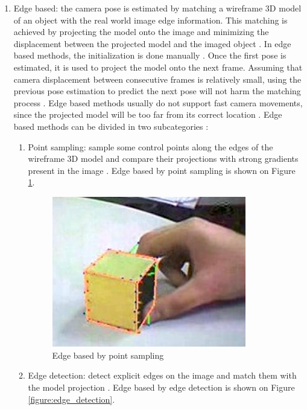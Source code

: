 \begin{enumerate}
  \item Edge based: the camera pose is estimated by matching a wireframe 3D model of an object with the real world image edge information. This matching is achieved by projecting the model onto the image and minimizing the displacement between the projected model and the imaged object \cite{Teichrieb2007,Lepetit2005}. In edge based methods, the initialization is done manually \cite{Teichrieb2007}. Once the first pose is estimated, it is used to project the model onto the next frame. Assuming that camera displacement between consecutive frames is relatively small, using the previous pose estimation to predict the next pose will not harm the matching process \cite{Teichrieb2007}. Edge based methods usually do not support fast camera movements, since the projected model will be too far from its correct location \cite{Teichrieb2007}. Edge based methods can be divided in two subcategories \cite{Teichrieb2007}:

    \begin{enumerate}
      \item Point sampling: sample some control points along the edges of the wireframe 3D model and compare their projections with strong gradients present in the image \cite{Teichrieb2007}. Edge based by point sampling is shown on Figure \ref{figure:point_sampling}.

      \begin{figure}[!htb]
        \centering
        \includegraphics[width=240pt]{chapters/basic_concepts/point_sampling.png}
        \caption{Edge based by point sampling}
        \label{figure:point_sampling}
      \end{figure}

      \item Edge detection: detect explicit edges on the image and match them with the model projection \cite{Teichrieb2007}. Edge based by edge detection is shown on Figure \ref{figure:edge_detection}.


\end{enumerate}
\end{enumerate}
